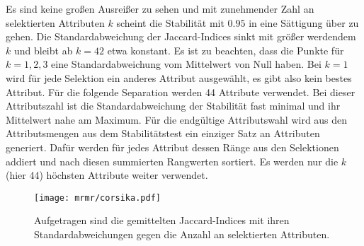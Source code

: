 Es sind keine großen Ausreißer zu sehen und mit zunehmender Zahl an selektierten Attributen $k$ scheint die Stabilität mit $\num{0.95}$ in eine Sättigung über zu gehen.
Die Standardabweichung der Jaccard-Indices sinkt mit größer werdendem $k$ und bleibt ab $k=42$ etwa konstant.
Es ist zu beachten, dass die Punkte für $k=1,2,3$ eine Standardabweichung vom Mittelwert von Null haben.
Bei $k=1$ wird für jede Selektion ein anderes Attribut ausgewählt, es gibt also kein bestes Attribut.
Für die folgende Separation werden 44 Attribute verwendet.
Bei dieser Attributszahl ist die Standardabweichung der Stabilität fast minimal und ihr Mittelwert nahe am Maximum.
Für die endgültige Attributswahl wird aus den Attributsmengen aus dem Stabilitätstest ein einziger Satz an Attributen generiert.
Dafür werden für jedes Attribut dessen Ränge aus den Selektionen addiert und nach diesen summierten Rangwerten sortiert. 
Es werden nur die $k$ (hier 44) höchsten Attribute weiter verwendet.




\begin{figure}
\begin{center}
    \texttt{[image: mrmr/corsika.pdf]}
\end{center}
\vspace{-2em}
\caption{Aufgetragen sind die gemittelten Jaccard-Indices mit ihren Standardabweichungen gegen die Anzahl an selektierten Attributen.}
\label{fig:mrmrnuvsmu}
\end{figure}


